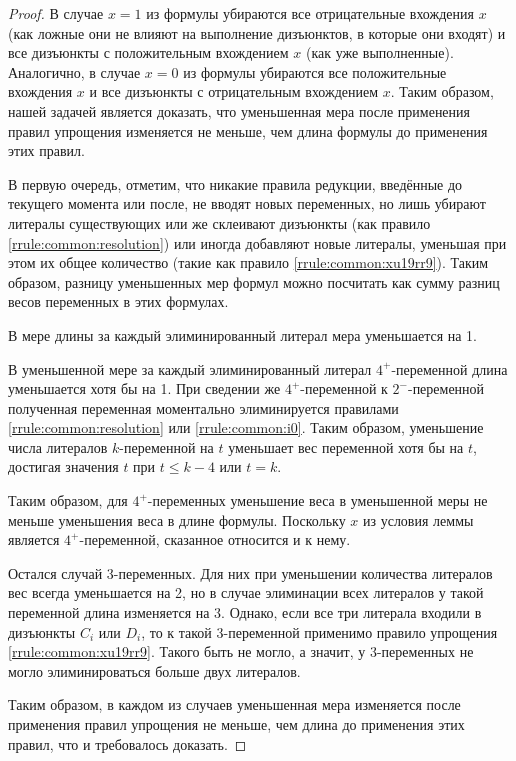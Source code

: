 \begin{proof}
 В случае $x = 1$ из формулы убираются все отрицательные вхождения $x$ (как ложные они не влияют на выполнение дизъюнктов, в которые они входят) и все дизъюнкты с положительным вхождением $x$ (как уже выполненные). Аналогично, в случае $x = 0$ из формулы убираются все положительные вхождения $x$ и все дизъюнкты с отрицательным вхождением $x$. Таким образом, нашей задачей является доказать, что уменьшенная мера после применения правил упрощения изменяется не меньше, чем длина формулы до применения этих правил.

 В первую очередь, отметим, что никакие правила редукции, введённые до текущего момента или после, не вводят новых переменных, но лишь убирают литералы существующих или же склеивают дизъюнкты (как правило \ref{rrule:common:resolution}) или иногда добавляют новые литералы, уменьшая при этом их общее количество (такие как правило \ref{rrule:common:xu19rr9}). Таким образом, разницу уменьшенных мер формул можно посчитать как сумму разниц весов переменных в этих формулах.

 В мере длины за каждый элиминированный литерал мера уменьшается на 1.

 В уменьшенной мере за каждый элиминированный литерал $4^+$-переменной длина уменьшается хотя бы на 1. При сведении же $4^+$-переменной к $2^-$-переменной полученная переменная моментально элиминируется правилами \ref{rrule:common:resolution} или \ref{rrule:common:i0}. Таким образом, уменьшение числа литералов $k$-переменной на $t$ уменьшает вес переменной хотя бы на $t$, достигая значения $t$ при $t \leq k - 4$ или $t = k$.

 Таким образом, для $4^+$-переменных уменьшение веса в уменьшенной меры не меньше уменьшения веса в длине формулы. Поскольку $x$ из условия леммы является $4^+$-переменной, сказанное относится и к нему.

 Остался случай 3-переменных. Для них при уменьшении количества литералов вес всегда уменьшается на 2, но в случае элиминации всех литералов у такой переменной длина изменяется на 3. Однако, если все три литерала входили в дизъюнкты $C_i$ или $D_i$, то к такой 3-переменной применимо правило упрощения \ref{rrule:common:xu19rr9}. Такого быть не могло, а значит, у 3-переменных не могло элиминироваться больше двух литералов.

 Таким образом, в каждом из случаев уменьшенная мера изменяется после применения правил упрощения не меньше, чем длина до применения этих правил, что и требовалось доказать.
\end{proof}

